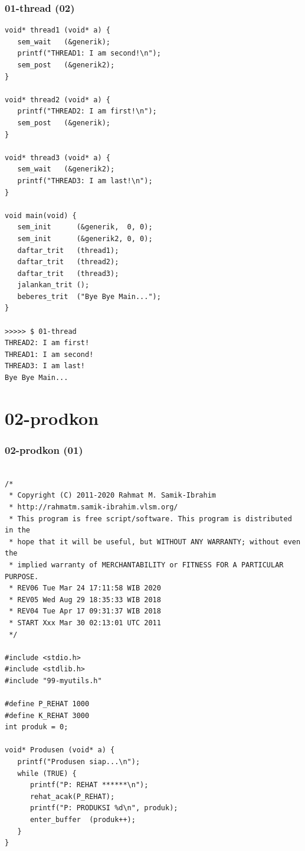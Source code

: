 \documentclass[xcolor=table, notheorems, hyperref={pdfpagelabels=false}]{beamer}
\begin{document}
\begin{frame}[fragile]
\frametitle{01-thread (02)}
\begin{lstlisting}[basicstyle=\ttfamily\tiny]
void* thread1 (void* a) {
   sem_wait   (&generik);
   printf("THREAD1: I am second!\n");
   sem_post   (&generik2);
}

void* thread2 (void* a) {
   printf("THREAD2: I am first!\n");
   sem_post   (&generik);
}

void* thread3 (void* a) {
   sem_wait   (&generik2);
   printf("THREAD3: I am last!\n");
}

void main(void) {
   sem_init      (&generik,  0, 0);
   sem_init      (&generik2, 0, 0);
   daftar_trit   (thread1);
   daftar_trit   (thread2);
   daftar_trit   (thread3);
   jalankan_trit ();
   beberes_trit  ("Bye Bye Main...");
}

>>>>> $ 01-thread 
THREAD2: I am first!
THREAD1: I am second!
THREAD3: I am last!
Bye Bye Main...

\end{lstlisting}
\end{frame}

\section{02-prodkon}
\begin{frame}[fragile]
\frametitle{02-prodkon (01)}
\begin{lstlisting}[basicstyle=\ttfamily\tiny]

/*
 * Copyright (C) 2011-2020 Rahmat M. Samik-Ibrahim
 * http://rahmatm.samik-ibrahim.vlsm.org/
 * This program is free script/software. This program is distributed in the 
 * hope that it will be useful, but WITHOUT ANY WARRANTY; without even the 
 * implied warranty of MERCHANTABILITY or FITNESS FOR A PARTICULAR PURPOSE.
 * REV06 Tue Mar 24 17:11:58 WIB 2020
 * REV05 Wed Aug 29 18:35:33 WIB 2018
 * REV04 Tue Apr 17 09:31:37 WIB 2018
 * START Xxx Mar 30 02:13:01 UTC 2011
 */

#include <stdio.h>
#include <stdlib.h>
#include "99-myutils.h"

#define P_REHAT 1000
#define K_REHAT 3000
int produk = 0;

void* Produsen (void* a) {
   printf("Produsen siap...\n");
   while (TRUE) {
      printf("P: REHAT ******\n");
      rehat_acak(P_REHAT);
      printf("P: PRODUKSI %d\n", produk);
      enter_buffer  (produk++);
   }
}

\end{lstlisting}
\end{frame}
\end{document}
